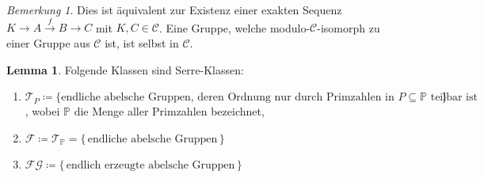 \documentclass[11pt, a4paper, german]{article}
\theoremstyle{definition}
\newtheorem{lem}{Lemma}
\theoremstyle{remark}
\newtheorem*{bem}{Bemerkung}
\newcommand{\SC}{\mathcal{C}} %
\newcommand{\FG}{\mathcal{FG}} %
\newcommand{\T}{\mathcal{T}} %
\newcommand{\F}{\mathcal{F}} %
\newcommand{\Primes}{\mathbb{P}} %
\begin{document}
\vspace{-1.5em}
\begin{bem}
  Dies ist äquivalent zur Existenz einer exakten Sequenz $K \to A \xrightarrow{f} B \to C$ mit $K, C \in \SC$.
  Eine Gruppe, welche modulo-$\SC$-isomorph zu einer Gruppe aus $\SC$ ist, ist selbst in $\SC$.
\end{bem}

\begin{lem}
  Folgende Klassen sind Serre-Klassen:
  \begin{enumerate}[label=\alph*)]
    \item $\T_P \coloneqq \{ \text{endliche abelsche Gruppen, deren Ordnung nur durch Primzahlen in $P \subseteq \Primes$ teilbar ist} \}$, wobei $\Primes$ die Menge aller Primzahlen bezeichnet,
    \item $\F \coloneqq \T_\Primes = \{\, \text{endliche abelsche Gruppen} \,\}$
    \item $\FG \coloneqq \{\, \text{endlich erzeugte abelsche Gruppen} \,\}$
  \end{enumerate}
\end{lem}
\end{document}

